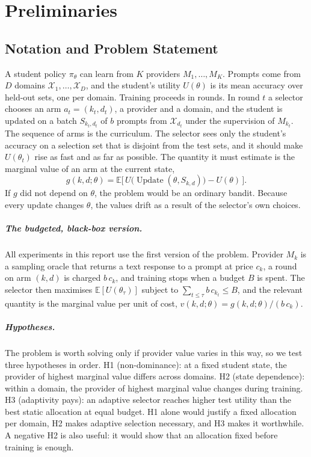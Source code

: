 \chapter{Preliminaries}
\label{ca:chap:prelim}

\section{Notation and Problem Statement}
\label{ca:sec:problem}

A student policy $\pi_\theta$ can learn from $K$ providers $M_1, \dots, M_K$. Prompts
come from $D$ domains $\mathcal{X}_1, \dots, \mathcal{X}_D$, and the student's utility
$U(\theta)$ is its mean accuracy over held-out sets, one per domain. Training proceeds in
rounds. In round $t$ a selector chooses an arm $a_t = (k_t, d_t)$, a provider and a
domain, and the student is updated on a batch $S_{k_t,d_t}$ of $b$ prompts from
$\mathcal{X}_{d_t}$ under the supervision of $M_{k_t}$. The sequence of arms is the
curriculum. The selector sees only the student's accuracy on a selection set that is
disjoint from the test sets, and it should make $U(\theta_t)$ rise as fast and as far as
possible. The quantity it must estimate is the marginal value of an arm at the current
state,
\[
  g(k, d; \theta) =
  \mathbb{E}\big[\, U\big(\operatorname{Update}(\theta, S_{k,d})\big) - U(\theta) \,\big].
\]
If $g$ did not depend on $\theta$, the problem would be an ordinary bandit. Because every
update changes $\theta$, the values drift as a result of the selector's own choices.

\paragraph{The budgeted, black-box version.} All experiments in this report use the first
version of the problem. Provider $M_k$ is a sampling oracle that returns a text response to
a prompt at price $c_k$, a round on arm $(k, d)$ is charged $b\,c_k$, and training stops
when a budget $B$ is spent. The selector then maximises $\mathbb{E}[U(\theta_\tau)]$
subject to $\sum_{t \le \tau} b\,c_{k_t} \le B$, and the relevant quantity is the marginal
value per unit of cost, $v(k, d; \theta) = g(k, d; \theta) / (b\,c_k)$.

\paragraph{Hypotheses.} The problem is worth solving only if provider value varies in this
way, so we test three hypotheses in order. H1 (non-dominance): at a fixed student state,
the provider of highest marginal value differs across domains. H2 (state dependence):
within a domain, the provider of highest marginal value changes during training. H3
(adaptivity pays): an adaptive selector reaches higher test utility than the best static
allocation at equal budget. H1 alone would justify a fixed allocation per domain, H2 makes
adaptive selection necessary, and H3 makes it worthwhile. A negative H2 is also useful: it
would show that an allocation fixed before training is enough.

